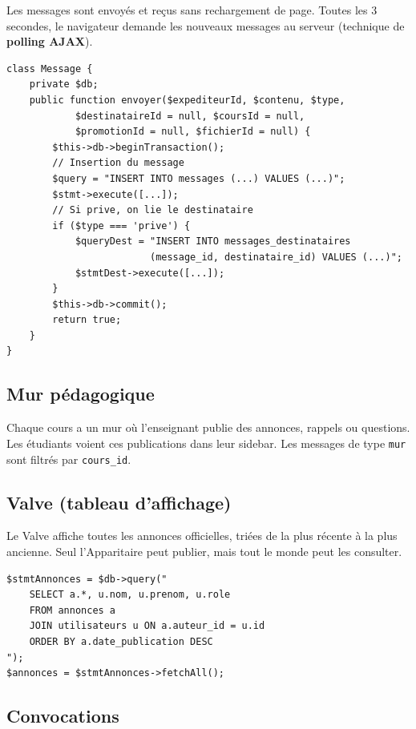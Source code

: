 \documentclass[12pt,a4paper]{article}
\begin{document}
Les messages sont envoy\'es et re\c{c}us sans rechargement de page. Toutes les
3 secondes, le navigateur demande les nouveaux messages au serveur (technique
de \textbf{polling AJAX}).

\begin{lstlisting}[style=phpphp, caption=Envoi d'un message (co^te' serveur)]
class Message {
    private $db;
    public function envoyer($expediteurId, $contenu, $type,
            $destinataireId = null, $coursId = null,
            $promotionId = null, $fichierId = null) {
        $this->db->beginTransaction();
        // Insertion du message
        $query = "INSERT INTO messages (...) VALUES (...)";
        $stmt->execute([...]);
        // Si prive, on lie le destinataire
        if ($type === 'prive') {
            $queryDest = "INSERT INTO messages_destinataires
                         (message_id, destinataire_id) VALUES (...)";
            $stmtDest->execute([...]);
        }
        $this->db->commit();
        return true;
    }
}
\end{lstlisting}

\subsection{Mur p\'edagogique}

Chaque cours a un mur o\`u l'enseignant publie des annonces, rappels ou
questions. Les \'etudiants voient ces publications dans leur sidebar. Les
messages de type \texttt{mur} sont filtr\'es par \texttt{cours\_id}.

\subsection{Valve (tableau d'affichage)}

Le Valve affiche toutes les annonces officielles, tri\'ees de la plus r\'ecente
\`a la plus ancienne. Seul l'Apparitaire peut publier, mais tout le monde peut
les consulter.

\begin{lstlisting}[style=phpphp, caption=Affichage des annonces]
$stmtAnnonces = $db->query("
    SELECT a.*, u.nom, u.prenom, u.role
    FROM annonces a
    JOIN utilisateurs u ON a.auteur_id = u.id
    ORDER BY a.date_publication DESC
");
$annonces = $stmtAnnonces->fetchAll();
\end{lstlisting}

\subsection{Convocations}
\end{document}
